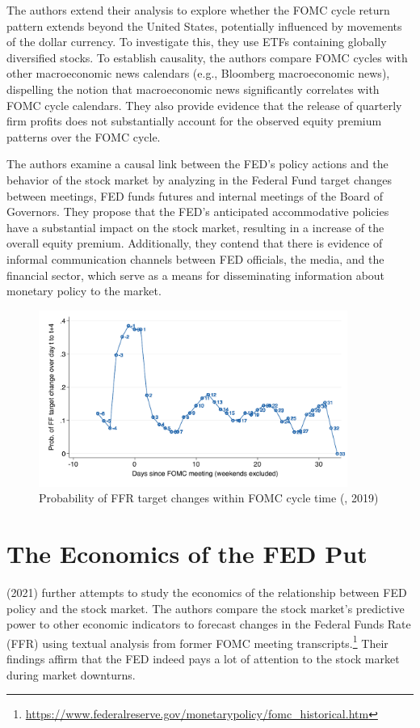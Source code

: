 The authors extend their analysis to explore whether the FOMC cycle return pattern extends beyond the United States, potentially influenced by movements of the dollar currency. To investigate this, they use ETFs containing globally diversified stocks. To establish causality, the authors compare FOMC cycles with other macroeconomic news calendars (e.g., Bloomberg macroeconomic news), dispelling the notion that macroeconomic news significantly correlates with FOMC cycle calendars. They also provide evidence that the release of quarterly firm profits does not substantially account for the observed equity premium patterns over the FOMC cycle.

The authors examine a causal link between the FED's policy actions and the behavior of the stock market by analyzing in the Federal Fund target changes between meetings,  FED funds futures and internal meetings of the Board of Governors. They propose that the FED's anticipated accommodative policies have a substantial impact on the stock market, resulting in a increase of the overall equity premium.  Additionally, they contend that there is evidence of informal communication channels between FED officials, the media, and the financial sector, which serve as a means for disseminating information about monetary policy to the market.

\begin{figure}[h]
    \centering
    \label{cies19_fig3A}
    \includegraphics[width=0.9\textwidth]{figures/cies19/fig3A}
    \caption{Probability of FFR target changes within FOMC cycle time (\cite{cieslak_stock_2019}, 2019) }
\end{figure}

\pagebreak

\section{The Economics of the FED Put}
\cite{cieslak_economics_2021} (2021) further attempts to study the economics of the relationship between FED policy and the stock market. The authors compare the stock market's predictive power to other economic indicators to forecast changes in the Federal Funds Rate (FFR) using textual analysis from former FOMC meeting transcripts.\footnote{\url{https://www.federalreserve.gov/monetarypolicy/fomc_historical.htm}} Their findings affirm that the FED indeed pays a lot of attention to the stock market during market downturns.

